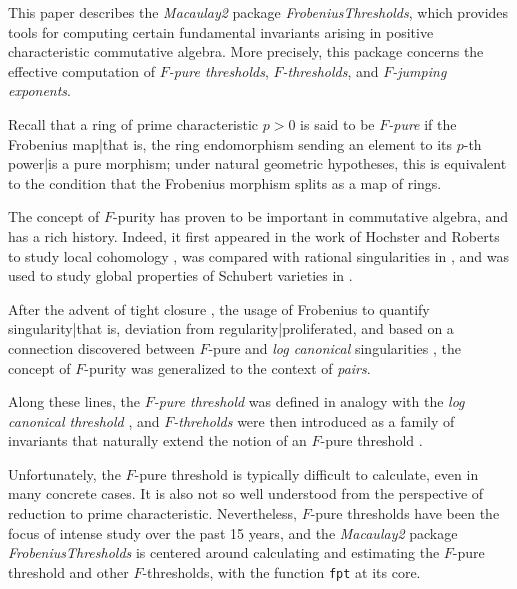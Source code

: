 \documentclass{amsart}
\begin{document}
This paper describes the \emph{Macaulay2} \cite{M2} package \emph{FrobeniusThresholds}, which provides tools for computing certain fundamental invariants arising in positive characteristic commutative algebra.  More precisely, this package concerns the effective computation of \emph{$F$-pure thresholds}, \emph{$F$-thresholds}, and \emph{$F$-jumping exponents}.

Recall that a ring of prime characteristic $p>0$ is said to be \emph{$F$-pure} if the Frobenius map|that is, the ring endomorphism sending an element to its $p$-th power|is a pure morphism;  under natural geometric hypotheses, this is equivalent to the condition that the Frobenius morphism splits as a map of rings.

The concept of $F$-purity has proven to be important in commutative algebra, and has a rich history.  Indeed, it first appeared in the work \cite{HochsterRobertsFrobeniusLocalCohomology}  of Hochster and Roberts to study local cohomology \cite{HochsterRobertsFrobeniusLocalCohomology}, was compared with rational singularities in  \cite{FedderFPureRat}, and was used to study global properties of Schubert varieties in \cite{MehtaRamanathanFrobeniusSplittingAndCohomologyVanishing}.

After the advent of tight closure \cite{HochsterHunekeTC1}, the usage of Frobenius to quantify singularity|that is, deviation from regularity|proliferated, and based on a connection discovered between $F$-pure and \emph{log canonical} singularities \cite{HaraWatanabeFRegFPure}, the concept of $F$-purity was generalized to the context of \emph{pairs}.

Along these lines, the \emph{$F$-pure threshold} %
was defined in analogy with the \emph{log canonical threshold} \cite{TakagiWatanabeFPureThresh}, and     
\emph{$F$-threholds} were then introduced as a family of invariants that naturally extend the notion of an $F$-pure threshold \cite{MustataTakagiWatanabeFThresholdsAndBernsteinSato}. 

Unfortunately, the $F$-pure threshold is typically difficult to calculate, even in many concrete cases.   It is also not so well understood from the perspective of reduction to prime characteristic.   Nevertheless, $F$-pure thresholds have been the focus of intense study over the past 15 years, and the \emph{Macaulay2} package \emph{FrobeniusThresholds} is centered around calculating and estimating the $F$-pure threshold and other $F$-thresholds, with the function {\tt fpt} at its core. 
\end{document}
